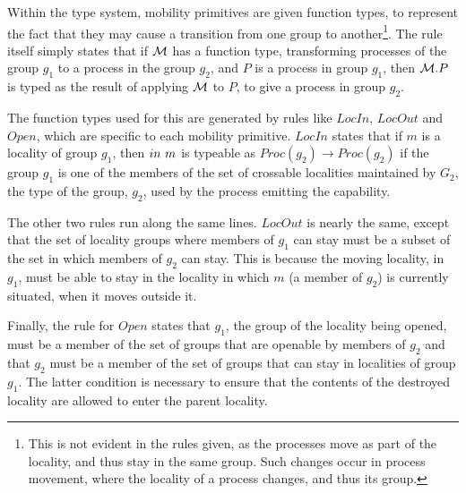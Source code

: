 Within the type system, mobility primitives are given function types, to
represent the fact that they may cause a transition from one group to
another\footnote{This is not evident in the rules given, as the
processes move as part of the locality, and thus stay in the same
group.  Such changes occur in process movement, where the locality of a
process changes, and thus its group.}.  The rule itself simply states
that if $\text{$\mathcal{M}$}$ has a function type, transforming processes of the
group $g_1$ to a process in the group $g_2$, and $P$ is a process in
group $g_1$, then $\text{$\mathcal{M}$}.P$ is typed as the result of applying $\text{$\mathcal{M}$}$
to $P$, to give a process in group $g_2$.

The function types used for this are generated by rules like $LocIn$,
$LocOut$ and $Open$, which are specific to each mobility primitive.
$LocIn$ states that if $m$ is a locality of group $g_1$, then
$in\ m$ is typeable as $Proc(g_2) \rightarrow Proc(g_2)$ if the
group $g_1$ is one of the members of the set of crossable localities
maintained by $G_2$, the type of the group, $g_2$, used by the process
emitting the capability.

The other two rules run along the same lines.  $LocOut$ is nearly the
same, except that the set of locality groups where members of $g_1$ can
stay must be a subset of the set in which members of $g_2$ can stay.
This is because the moving locality, in $g_1$, must be able to stay in
the locality in which $m$ (a member of $g_2$) is currently situated,
when it moves outside it.

Finally, the rule for $Open$ states that $g_1$, the group of the
locality being opened, must be a member of the set of groups that are
openable by members of $g_2$ and that $g_2$ must be a member of the set
of groups that can stay in localities of group $g_1$.  The latter
condition is necessary to ensure that the contents of the destroyed
locality are allowed to enter the parent locality.

